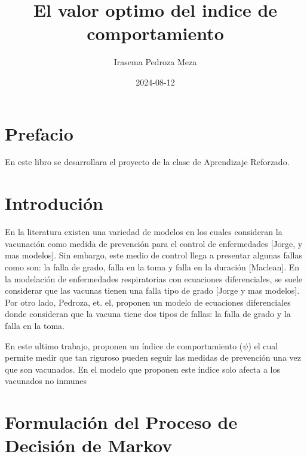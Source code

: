 \documentclass[
  letterpaper,
  DIV=11,
  numbers=noendperiod]{scrreprt}
\title{El valor optimo del indice de comportamiento}
\author{Irasema Pedroza Meza}
\date{2024-08-12}
\renewcommand*\contentsname{Table of contents}
\newcommand\contentsname{Table of contents}
\begin{document}
\maketitle

\renewcommand*\contentsname{Table of contents}
{
\hypersetup{linkcolor=}
\setcounter{tocdepth}{2}
\tableofcontents
}


\chapter*{Prefacio}\label{prefacio}


En este libro se desarrollara el proyecto de la clase de Aprendizaje
Reforzado.


\chapter{Introdución}\label{introduciuxf3n}

En la literatura existen una variedad de modelos en los cuales
consideran la vacunación como medida de prevención para el control de
enfermedades {[}Jorge, y mas modelos{]}. Sin embargo, este medio de
control llega a presentar algunas fallas como son: la falla de grado,
falla en la toma y falla en la duración {[}Maclean{]}. En la modelación
de enfermedades respiratorias con ecuaciones diferenciales, se suele
considerar que las vacunas tienen una falla tipo de grado {[}Jorge y mas
modelos{]}. Por otro lado, Pedroza, et. el, proponen un modelo de
ecuaciones diferenciales donde consideran que la vacuna tiene dos tipos
de fallas: la falla de grado y la falla en la toma.

En este ultimo trabajo, proponen un índice de comportamiento (\(\psi\))
el cual permite medir que tan riguroso pueden seguir las medidas de
prevención una vez que son vacunados. En el modelo que proponen este
índice solo afecta a los vacunados no inmunes


\chapter{Formulación del Proceso de Decisión de
Markov}\label{formulaciuxf3n-del-proceso-de-decisiuxf3n-de-markov}
\end{document}

